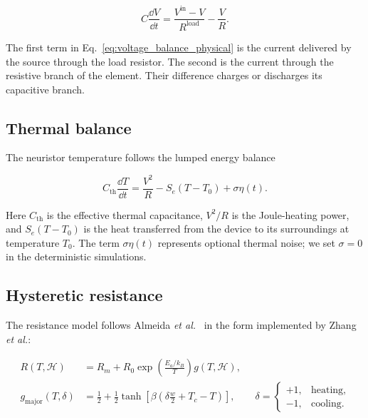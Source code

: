 \begin{equation}
    C\frac{\dd V}{\dd t}
    =
    \frac{V^{\mathrm{in}}-V}{R^{\mathrm{load}}}
    -\frac{V}{R}.
    \label{eq:voltage_balance_physical}
\end{equation}

The first term in Eq.~\eqref{eq:voltage_balance_physical} is the current
delivered by the source through the load resistor. The second is the current
through the resistive branch of the \VOtwo{} element. Their difference charges
or discharges its capacitive branch.

\subsection{Thermal balance}

The neuristor temperature follows the lumped energy balance

\begin{equation}
    C_{\mathrm{th}}\frac{\dd T}{\dd t}
    =
    \frac{V^2}{R}
    -S_e\left(T-T_0\right)
    +\sigma\eta(t).
    \label{eq:thermal_balance}
\end{equation}

Here $C_{\mathrm{th}}$ is the effective thermal capacitance, $V^2/R$ is the
Joule-heating power, and $S_e(T-T_0)$ is the heat transferred from the device
to its surroundings at temperature $T_0$. The term $\sigma\eta(t)$ represents
optional thermal noise; we set $\sigma=0$ in the deterministic simulations.

\subsection{Hysteretic resistance}

The resistance model follows Almeida \emph{et al.}~\cite{almeida2002hysteretic}
in the form implemented by Zhang \emph{et al.}:

\begin{align}
    R(T,\mathcal H)
    &=R_m+R_0\exp\!\left(\frac{E_a/k_B}{T}\right)g(T,\mathcal H),
    \label{eq:almeida_resistance}\\
    g_{\mathrm{major}}(T,\delta)
    &=\frac{1}{2}+\frac{1}{2}\tanh\!\left[
        \beta\left(\delta\frac{w}{2}+T_c-T\right)
    \right],
    \qquad
    \delta=\begin{cases}+1,&\text{heating},\\-1,&\text{cooling}.
    \end{cases}
    \label{eq:almeida_major}
\end{align}

